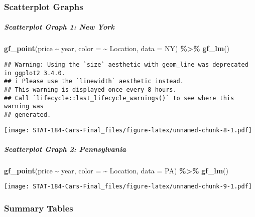 \documentclass[
]{article}
\newenvironment{Shaded}{\begin{snugshade}}{\end{snugshade}}
\newcommand{\AttributeTok}[1]{\textcolor[rgb]{0.13,0.29,0.53}{#1}}
\newcommand{\FunctionTok}[1]{\textcolor[rgb]{0.13,0.29,0.53}{\textbf{#1}}}
\newcommand{\NormalTok}[1]{#1}
\newcommand{\SpecialCharTok}[1]{\textcolor[rgb]{0.81,0.36,0.00}{\textbf{#1}}}
\begin{document}
\hypertarget{scatterplot-graphs}{%
\subsubsection{\texorpdfstring{\textbf{Scatterplot
Graphs}}{Scatterplot Graphs}}\label{scatterplot-graphs}}

\hypertarget{scatterplot-graph-1-new-york}{%
\subparagraph{Scatterplot Graph 1: New
York}\label{scatterplot-graph-1-new-york}}

\begin{Shaded}
\begin{Highlighting}[]
\FunctionTok{gf\_point}\NormalTok{(price }\SpecialCharTok{\textasciitilde{}}\NormalTok{ year, }\AttributeTok{color =} \SpecialCharTok{\textasciitilde{}}\NormalTok{ Location, }\AttributeTok{data =}\NormalTok{ NY) }\SpecialCharTok{\%\textgreater{}\%}
  \FunctionTok{gf\_lm}\NormalTok{()}
\end{Highlighting}
\end{Shaded}

\begin{verbatim}
## Warning: Using the `size` aesthetic with geom_line was deprecated in ggplot2 3.4.0.
## i Please use the `linewidth` aesthetic instead.
## This warning is displayed once every 8 hours.
## Call `lifecycle::last_lifecycle_warnings()` to see where this warning was
## generated.
\end{verbatim}

\texttt{[image: STAT-184-Cars-Final\_files/figure-latex/unnamed-chunk-8-1.pdf]}

\hypertarget{scatterplot-graph-2-pennsylvania}{%
\subparagraph{Scatterplot Graph 2:
Pennsylvania}\label{scatterplot-graph-2-pennsylvania}}

\begin{Shaded}
\begin{Highlighting}[]
\FunctionTok{gf\_point}\NormalTok{(price }\SpecialCharTok{\textasciitilde{}}\NormalTok{ year, }\AttributeTok{color =} \SpecialCharTok{\textasciitilde{}}\NormalTok{ Location, }\AttributeTok{data =}\NormalTok{ PA) }\SpecialCharTok{\%\textgreater{}\%}
  \FunctionTok{gf\_lm}\NormalTok{()}
\end{Highlighting}
\end{Shaded}

\texttt{[image: STAT-184-Cars-Final\_files/figure-latex/unnamed-chunk-9-1.pdf]}

\hypertarget{summary-tables}{%
\subsubsection{\texorpdfstring{\textbf{Summary
Tables}}{Summary Tables}}\label{summary-tables}}
\end{document}

